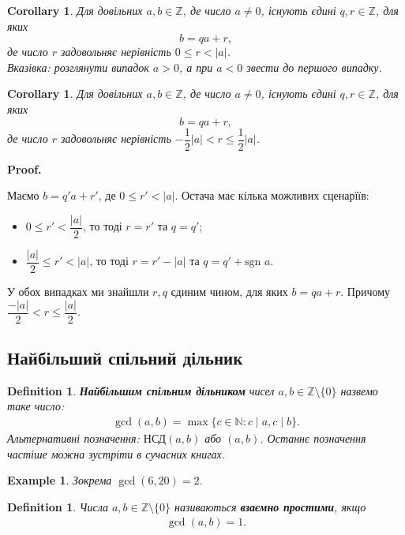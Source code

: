 \documentclass[a4paper, 10pt]{article}
\makeatletter
\theoremstyle{theoremdd}
\theoremstyle{theoremdd}
\newtheorem{definition}[theorem]{Definition}
\theoremstyle{theoremdd}
\theoremstyle{theoremdd}
\newtheorem{example}[theorem]{Example}
\theoremstyle{theoremdd}
\theoremstyle{theoremdd}
\theoremstyle{theoremdd}
\theoremstyle{theoremdd}
\newtheorem{corollary}[theorem]{Corollary}
\renewenvironment{proof}[1][Proof.\\]{\par
\pushQED{\hfill \qed}%
\normalfont \topsep6\p@\@plus6\p@\relax
\trivlist
\item\relax
{\bfseries
#1\@addpunct{.}}\hspace\labelsep\ignorespaces
}{%
\popQED\endtrivlist\@endpefalse
}
\makeatother
\begin{document}
\begin{corollary}
Для довільних $a,b \in \mathbb{Z}$, де число $a \neq 0$, існують єдині $q,r \in \mathbb{Z}$, для яких \[
b = qa+r,
\] де число $r$ задовольняє нерівність $0 \leq r < |a|$.\\
\textit{Вказівка: розглянути випадок $a >0$, а при $a < 0$ звести до першого випадку.}
\end{corollary}

\begin{corollary}
Для довільних $a,b \in \mathbb{Z}$, де число $a \neq 0$, існують єдині $q,r \in \mathbb{Z}$, для яких \[
b = qa+r,
\]
де число $r$ задовольняє нерівність $-\dfrac{1}{2}|a| < r \leq \dfrac{1}{2}|a|$.
\end{corollary}

\begin{proof}
Маємо $b = q'a+r'$, де $0 \leq r' < |a|$. Остача має кілька можливих сценарїїв:
\begin{itemize}[nosep,wide=0pt]
\item $0 \leq r' < \dfrac{|a|}{2}$, то тоді $r = r'$ та $q = q'$;
\item $\dfrac{|a|}{2} \leq r' < |a|$, то тоді $r = r' - |a|$ та $q = q'+\text{sgn } a$.
\end{itemize}
У обох випадках ми знайшли $r,q$ єдиним чином, для яких $b = qa+r$. Причому $\dfrac{-|a|}{2} < r \leq \dfrac{|a|}{2}$.
\end{proof}

\subsection{Найбільший спільний дільник}
\begin{definition}
\textbf{Найбільшим спільним дільником} чисел $a,b \in \mathbb{Z} \setminus \{0\}$ назвемо таке число:
\begin{align*}
\gcd(a,b) = \max\{c \in \mathbb{N}: c \mid a, c \mid b\}.
\end{align*}
Альтернативні позначення: $\text{НСД}(a,b)$ або $(a,b)$. Останнє позначення частіше можна зустріти в сучасних книгах.
\end{definition}

\begin{example}
Зокрема $\gcd(6,20) = 2$.
\end{example}

\begin{definition}
Числа $a,b \in \mathbb{Z} \setminus \{0\}$ називаються \textbf{взаємно простими}, якщо
\begin{align*}
\gcd(a,b) = 1.
\end{align*}
\end{definition}
\end{document}
